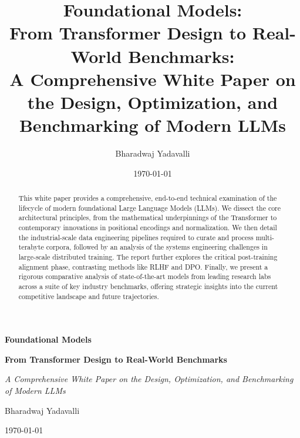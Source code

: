 \documentclass[12pt, a4paper]{article}
\title{\Huge\bfseries Foundational Models: \\From Transformer Design to Real-World Benchmarks:\\A Comprehensive White Paper on the Design, Optimization, and Benchmarking of Modern LLMs}
\author{\Large Bharadwaj Yadavalli}
\date{\today}
\begin{document}
\begin{titlepage}
    \centering
    \vspace*{2cm} %

    {\Huge\bfseries Foundational Models \par}
    \vspace{0.5cm}
    {\LARGE\bfseries From Transformer Design to Real-World Benchmarks \par}
    \vspace{1cm}
    {\large\itshape A Comprehensive White Paper on the Design, Optimization, and Benchmarking of Modern LLMs \par}

    \vfill %

    {\Large Bharadwaj Yadavalli \par}
    \vspace{0.3cm}
    {\Large \today \par} %

    \vspace*{2cm} %
\end{titlepage}






\begin{abstract}
This white paper provides a comprehensive, end-to-end technical examination of the lifecycle of modern foundational Large Language Models (LLMs). We dissect the core architectural principles, from the mathematical underpinnings of the Transformer to contemporary innovations in positional encodings and normalization. We then detail the industrial-scale data engineering pipelines required to curate and process multi-terabyte corpora, followed by an analysis of the systems engineering challenges in large-scale distributed training. The report further explores the critical post-training alignment phase, contrasting methods like RLHF and DPO. Finally, we present a rigorous comparative analysis of state-of-the-art models from leading research labs across a suite of key industry benchmarks, offering strategic insights into the current competitive landscape and future trajectories.
\end{abstract}
\end{document}

